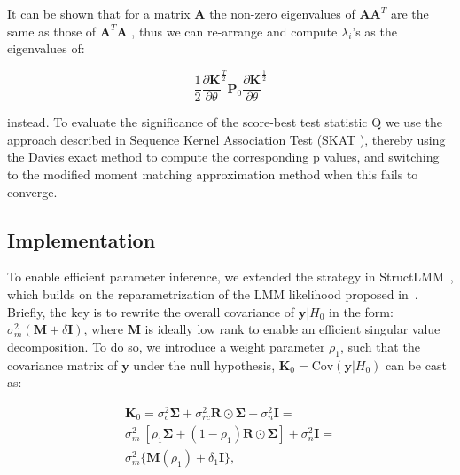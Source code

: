 It can be shown that for a matrix $\mathbf{A}$ the non-zero eigenvalues of $\mathbf{A}\mathbf{A}^T$ are the same as those of $\mathbf{A}^T\mathbf{A}$ , thus we can re-arrange and compute $\lambda_i$'s as the eigenvalues of:

\begin{equation}
    \frac{1}{2}\frac{\partial\mathbf{K}}{\partial \theta}^{\frac{T}{2}} \mathbf{P}_0 \frac{\partial\mathbf{K}}{\partial \theta}^{\frac{1}{2}}
\end{equation}

instead. 
To evaluate the significance of the score-best test statistic $\mathrm{Q}$ we use the approach described in Sequence Kernel Association Test (SKAT \cite{wu2011rare}), thereby using the Davies exact method \cite{davies1980algorithm} to compute the corresponding p values, and switching to the modified moment matching approximation method \cite{liu2009new, lee2012optimal, duchesne2010computing} when this fails to converge.

\subsection{Implementation}

To enable efficient parameter inference, we extended the strategy in StructLMM~\cite{moore2019linear}, which builds on the reparametrization of the LMM likelihood proposed in~\cite{lippert2011fast}. 
Briefly, the key is to rewrite the overall covariance of $\mathbf{y}|H_0$ in the form: $\sigma^2_m(\mathbf{M}+\delta\mathbf{I})$, where $\mathbf{M}$ is ideally low rank to enable an efficient singular value decomposition.  
To do so, we introduce a weight parameter $\rho_1$, such that the covariance matrix of $\mathbf{y}$ under the null hypothesis, $\mathbf{K}_0 = \mathrm{Cov}(\mathbf{y} | H_0)$ can be cast as:

\begin{equation}\label{K0}
\begin{split}
    \mathbf{K}_0 = \sigma_c^2 \boldsymbol{\Sigma} + \sigma_{rc}^2 \mathbf{R} \odot \boldsymbol{\Sigma}+ \sigma_n^2 \mathbf{I} =\\
    \sigma_m^2 \ [\rho_1\boldsymbol{\Sigma} + (1-\rho_1) \mathbf{R} \odot \boldsymbol{\Sigma}] + \sigma_n^2 \mathbf{I} =\\ \sigma_m^2 \{ {\mathbf{M}(\rho_1) + \delta_1 \mathbf{I}\}},
\end{split}
\end{equation}

